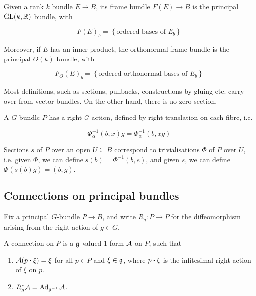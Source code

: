 \begin{definition}
     Given a rank \(k\) bundle \(E \to B\), its frame bundle \(F(E) \to B\) is the principal \(\operatorname{GL}(k, \mathbb{R})\) bundle, with

    \[F(E)_b = \left\{\text{ordered bases of }E_b\right\}\]

    Moreover, if \(E\) has an inner product, the orthonormal frame bundle is the principal \(O(k)\) bundle, with

    \[F_O(E)_b = \left\{\text{ordered orthonormal bases of }E_b\right\}\]
\end{definition}

\begin{remark}
    Most definitions, such as sections, pullbacks, constructions by gluing etc. carry over from vector bundles. On the other hand, there is no zero section.
\end{remark}

\begin{lemma}
    A \(G\)-bundle \(P\) has a right \(G\)-action, defined by right translation on each fibre, i.e.

    \[\Phi_\alpha^{-1}(b, x)g = \Phi_\alpha^{-1}(b, xg)\]
\end{lemma}

\begin{lemma}
    Sections \(s\) of \(P\) over an open \(U \subseteq B\) correspond to trivialisations \(\Phi\) of \(P\) over \(U\), i.e. given \(\Phi\), we can define \(s(b) = \Phi^{-1}(b, e)\), and given \(s\), we can define \(\Phi(s(b)g) = (b, g)\).
\end{lemma}

\subsection{Connections on principal bundles}

Fix a principal \(G\)-bundle \(P \to B\), and write \(R_g : P \to P\) for the diffeomorphism arising from the right action of \(g \in G\).

\begin{definition}
    [connection] A connection on \(P\) is a \(\mathfrak{g}\)-valued \(1\)-form \(\mathcal{A}\) on \(P\), such that 

    \begin{enumerate}
        \item \(\mcA(p \vdot \xi) = \xi\) for all \(p \in P\) and \(\xi \in \mathfrak{g}\), where \(p \vdot \xi\) is the infitesimal right action of \(\xi\) on \(p\).
        \item \(R_g^*\mathcal{A} = \operatorname{Ad}_{g^{-1}}\mathcal{A}\).
    \end{enumerate}
\end{definition}

